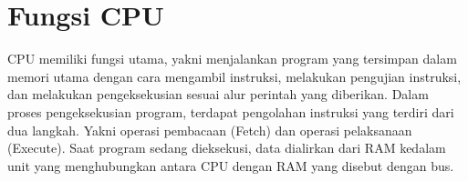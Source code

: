 \section{Fungsi CPU}
	CPU memiliki fungsi utama, yakni menjalankan program yang tersimpan dalam memori utama dengan cara mengambil instruksi, melakukan pengujian  instruksi, dan melakukan pengeksekusian sesuai alur perintah yang diberikan. Dalam proses pengeksekusian program, terdapat pengolahan instruksi yang terdiri dari dua langkah. Yakni operasi pembacaan (Fetch) dan operasi pelaksanaan (Execute). Saat program sedang dieksekusi, data dialirkan dari RAM kedalam unit yang menghubungkan antara CPU dengan RAM yang disebut dengan bus.